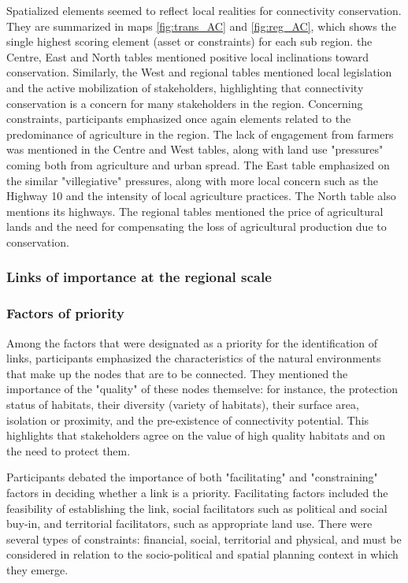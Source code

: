 Spatialized elements seemed to reflect local realities for connectivity conservation. They are summarized in maps \ref{fig:trans_AC} and \ref{fig:reg_AC}, which shows the single highest scoring element (asset or constraints) for each sub region. the Centre, East and North tables mentioned positive local inclinations toward conservation. Similarly, the West and regional tables mentioned local legislation and the active mobilization of stakeholders, highlighting that connectivity conservation is a concern for many stakeholders in the region. Concerning constraints, participants emphasized once again elements related to the predominance of agriculture in the region. The lack of engagement from farmers was mentioned in the Centre and West tables, along with land use "pressures" coming both from agriculture and urban spread. The East table emphasized on the similar "villegiative" pressures, along with more local concern such as the Highway 10 and the intensity of local agriculture practices. The North table also mentions its highways. The regional tables mentioned the price of agricultural lands and the need for compensating the loss of agricultural production due to conservation. \\

\subsubsection{Links of importance at the regional scale}

\subsubsection*{Factors of priority}

Among the factors that were designated as a priority for the identification of links, participants emphasized the characteristics of the natural environments that make up the nodes that are to be connected. They mentioned the importance of the "quality" of these nodes themselve: for instance, the protection status of habitats, their diversity (variety of habitats), their surface area, isolation or proximity, and the pre-existence of connectivity potential. This highlights that stakeholders agree on the value of high quality habitats and on the need to protect them.

Participants debated the importance of both "facilitating" and "constraining" factors in deciding whether a link is a priority. Facilitating factors included the feasibility of establishing the link, social facilitators such as political and social buy-in, and territorial facilitators, such as appropriate land use. There were several types of constraints: financial, social, territorial and physical, and must be considered in relation to the socio-political and spatial planning context in which they emerge.

